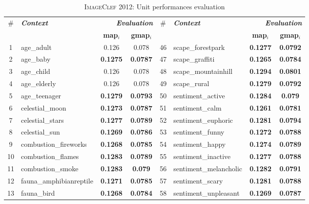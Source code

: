 \begin{table}[ht!]
	\centering
	\caption{\textsc{ImageClef 2012}: Unit performances evaluation}
	\label{unit}
\begin{scriptsize}
\begin{tabular}{|c|lcc||c|lcc|}
	\hline
	\#  &\textbf{\textit{Context}}	& \multicolumn{2}{l||}{\textbf{\textit{{~~~~Evaluation} }}}
	&
	\# 		& 
	\textbf{\textit{Context}} 	& 
	\multicolumn{2}{l|}{\textbf{\textit{{~~~~Evaluation} }}} \\
        	&  &  \textbf{map$_{i}$} &  \textbf{gmap$_{i}$} &   & & \textbf{map$_{i}$}	&  \textbf{gmap$_{i}$}     \\
	\hline \hline

1&age\_adult&		0.126&		0.078&			46&scape\_forestpark&	\textbf{0.1277}& 	\textbf{0.0792}\\
2&age\_baby&		\textbf{0.1275}&\textbf{0.0787}&	47&scape\_graffiti&	\textbf{0.1265}&	\textbf{0.0784}\\    
3&age\_child&		0.126&		0.078&			48&scape\_mountainhill&	\textbf{0.1294}&	\textbf{0.0801}\\         
4&age\_elderly&		0.126&		0.078&			49&scape\_rural&	\textbf{0.1279}&	\textbf{0.0792}\\  
5&age\_teenager&	\textbf{0.1279}&\textbf{0.0793}&	50&sentiment\_active&   \textbf{0.1284}&	\textbf{0.079}\\         
6&celestial\_moon&	\textbf{0.1273}&\textbf{0.0787}&	51&sentiment\_calm&	\textbf{0.1261}&    	\textbf{0.0781}\\         
7&celestial\_stars&	\textbf{0.1277}&\textbf{0.0789}&	52&sentiment\_euphoric&	\textbf{0.1281}&	\textbf{0.0794}\\         
8&celestial\_sun&	\textbf{0.1269}&\textbf{0.0786}&	53&sentiment\_funny&	\textbf{0.1272}&	\textbf{0.0788}\\         
9&combustion\_fireworks&\textbf{0.1268}&\textbf{0.0785}&        54&sentiment\_happy&	\textbf{0.1274}&	\textbf{0.0789}\\         
10&combustion\_flames&  \textbf{0.1283}&\textbf{0.0789}&        55&sentiment\_inactive& \textbf{0.1277}&	\textbf{0.0788}\\         
11&combustion\_smoke& 	\textbf{0.1283}&\textbf{0.079}&		56&sentiment\_melancholic&\textbf{0.1282}&	\textbf{0.0791}\\         
12&fauna\_amphibianreptile&\textbf{0.1271}&\textbf{0.0785}&	57&sentiment\_scary&	\textbf{0.1281}&	\textbf{0.0788}\\         
13&fauna\_bird&		\textbf{0.1268}&\textbf{0.0784}&	58&sentiment\_unpleasant&\textbf{0.1269}&	\textbf{0.0787}\\         

\end{tabular}
\end{scriptsize}
\end{table}
